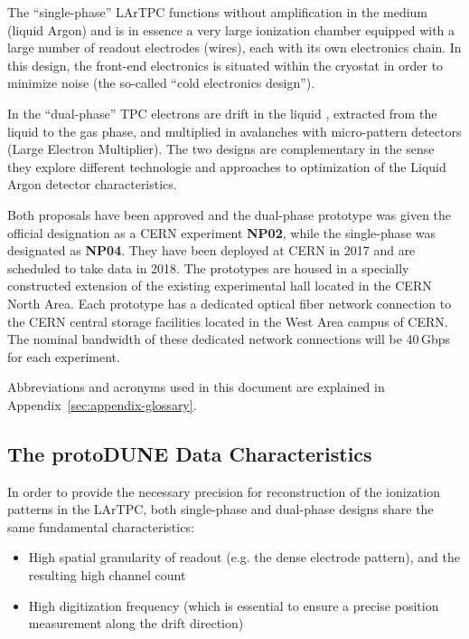 \documentclass[12pt]{article}
\begin{document}
The ``single-phase''  LArTPC functions without amplification in the medium (liquid Argon) and is in essence a very large ionization chamber
equipped with a large number of readout electrodes (wires), each with its own electronics chain. In this design, the front-end electronics is
situated within the cryostat in order to minimize noise (the so-called ``cold electronics design'').

In the ``dual-phase''  TPC electrons are drift in the liquid ,  extracted from the liquid to the gas phase, and multiplied in avalanches with micro-pattern detectors (Large Electron Multiplier). 
The two designs are complementary
in the sense they explore different technologie and approaches to optimization of the Liquid Argon detector characteristics.

Both  proposals have been approved and the dual-phase prototype was given the official designation as a CERN experiment \textbf{NP02},
while the single-phase was designated as \textbf{NP04}. They have been deployed at CERN in 2017 and are scheduled to take data in 2018.
The prototypes are housed in a specially constructed extension of the existing experimental hall located in the CERN North Area.
Each prototype has a dedicated optical fiber network connection to the CERN central storage facilities located in the West Area
campus of CERN. The nominal bandwidth of these dedicated network connections will be 40\,Gbps for each experiment.

Abbreviations and acronyms used in this document are explained in Appendix~\ref{sec:appendix-glossary}.


\subsection{The protoDUNE Data Characteristics}

In order to provide the necessary precision for reconstruction of the ionization patterns in the LArTPC, both single-phase and dual-phase designs share the same fundamental characteristics:
\begin{itemize}
\item High spatial granularity of readout (e.g. the dense electrode pattern), and the resulting high channel count
\item High digitization frequency (which is essential to ensure a precise position measurement along the drift direction)
\end{itemize}
\end{document}
